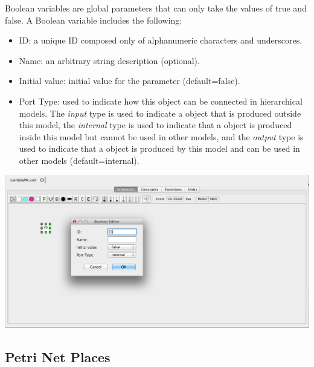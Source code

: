 \documentclass[titlepage,11pt]{article}
\begin{document}
\noindent
Boolean variables are global parameters that can only take the values of true and false.  A Boolean variable includes the following:
\begin{itemize}
\item ID: a unique ID composed only of alphanumeric characters and underscores.
\item Name: an arbitrary string description (optional).
\item Initial value: initial value for the parameter (default=false).
\item Port Type: used to indicate how this object can be connected in hierarchical models.  The \emph{input} type is used to indicate a object that is produced outside this model, the \emph{internal} type is used to indicate that a object is produced inside this model but cannot be used in other models, and the \emph{output} type is used to indicate that a object is produced by this model and can be used in other models (default=internal). 
\end{itemize}

\begin{center}
\includegraphics[width=160mm]{screenshots/Boolean}
\end{center}

\clearpage

\subsection{\label{Places}Petri Net Places}
\end{document}

